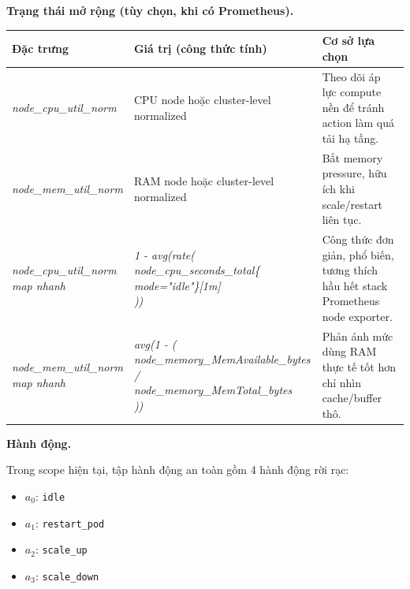 \noindent \textbf{Trạng thái mở rộng (tùy chọn, khi có Prometheus).}
\begin{center}
\setlength{\tabcolsep}{4pt}
\renewcommand{\arraystretch}{1.3}
\begin{tabular}{|>{\hspace{2pt}\raggedright\arraybackslash}p{}|>{\hspace{2pt}\raggedright\arraybackslash}p{}|>{\hspace{2pt}\raggedright\arraybackslash}p{}|}
\hline
\textbf{Đặc trưng} & \textbf{Giá trị (công thức tính)} & \textbf{Cơ sở lựa chọn} \\ \hline
\textit{node\_cpu\_util\_norm} & CPU node hoặc cluster-level normalized & Theo dõi áp lực compute nền để tránh action làm quá tải hạ tầng. \\ \hline
\textit{node\_mem\_util\_norm} & RAM node hoặc cluster-level normalized & Bắt memory pressure, hữu ích khi scale/restart liên tục. \\ \hline
\makecell[l]{\textit{node\_cpu\_util\_norm}\\ \textit{map nhanh}} & \makecell[l]{\textit{1 - avg(rate(}\\ \textit{node\_cpu\_seconds\_total\{}\\ \textit{mode="idle"\}[1m]}\\ \textit{))}} & Công thức đơn giản, phổ biến, tương thích hầu hết stack Prometheus node exporter. \\ \hline
\makecell[l]{\textit{node\_mem\_util\_norm}\\ \textit{map nhanh}} & \makecell[l]{\textit{avg(1 - (}\\ \textit{node\_memory\_MemAvailable\_bytes /}\\ \textit{node\_memory\_MemTotal\_bytes}\\ \textit{))}} & Phản ánh mức dùng RAM thực tế tốt hơn chỉ nhìn cache/buffer thô. \\ \hline
\end{tabular}
\end{center}

\noindent\textbf{Hành động.}

\noindent Trong scope hiện tại, tập hành động an toàn gồm 4 hành động rời rạc:
\begin{itemize}
    \item $a_0$: \texttt{idle}
    \item $a_1$: \texttt{restart\_pod}
    \item $a_2$: \texttt{scale\_up}
    \item $a_3$: \texttt{scale\_down}
\end{itemize}


